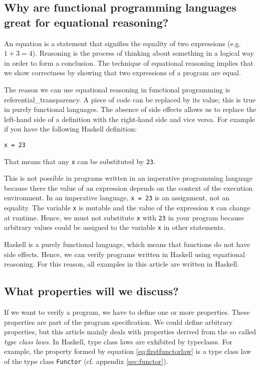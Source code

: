 \subsection{Why are functional programming languages great for equational reasoning?}

An equation is a statement that signifies the equality of two expressions (e.g. $1 + 3 = 4$). Reasoning is the process of thinking about something in a logical way in order to form a conclusion. The technique of equational reasoning implies that we show correctness by showing that two expressions of a program are equal. 

The reason we can use equational reasoning in functional programming is \gls{referential_transparency}. A piece of code can be replaced by its value; this is true in purely functional languages. The absence of side effects allows us to replace the left-hand side of a definition with the right-hand side and vice versa. For example if you have the following Haskell definition:
\begin{verbatim}
x = 23
\end{verbatim}
That means that any \verb|x| can be substituted by \verb|23|.

This is not possible in programs written in an imperative programming language because there the value of an expression depends on the context of the execution environment. In an imperative language, \verb|x = 23| is an assignment, not an equality. The variable \verb|x| is mutable and the value of the expression \verb|x| can change at runtime. Hence, we must not substitute \verb|x| with \verb|23| in your program because arbitrary values could be assigned to the variable \verb|x| in other statements.

Haskell is a purely functional language, which means that functions do not have side effects. Hence, we can verify programs written in Haskell using equational reasoning. For this reason, all examples in this article are written in Haskell.

\subsection{What properties will we discuss?}

If we want to verify a program, we have to define one or more properties. These properties are part of the program specification. We could define arbitrary properties, but this article mainly deals with properties derived from the so called \emph{type class laws}. In Haskell, type class laws are exhibited by \glspl{typeclass}. For example, the property formed by equation \ref{eq:firstfunctorlaw} is a type class law of the type class \verb|Functor| (cf. appendix \ref{sec:functor}).

